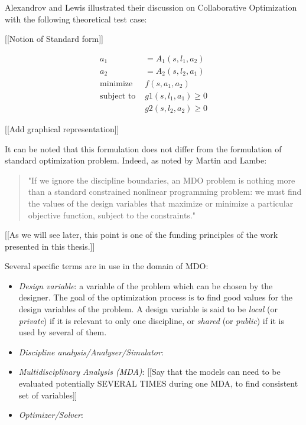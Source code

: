 Alexandrov and Lewis illustrated their discussion on Collaborative Optimization\cite{NataliaM.:2000:ACA:886733} with the following theoretical test case:

[[Notion of Standard form]]

\begin{align*}
a_1 &= A_1(s, l_1, a_2) \\
a_2 &= A_2(s, l_2, a_1) \\
\text{minimize } &f(s, a_1, a_2) \\
\text{subject to } &g1(s, l_1, a_1) \geq 0 \\
								&g2(s, l_2, a_2) \geq 0
\end{align*}

[[Add graphical representation]]

It can be noted that this formulation does not differ from the formulation of standard optimization problem. Indeed, as noted by Martin and Lambe\cite{Lambe:2011:A}:
 \begin{quote}
 "If we ignore the discipline boundaries, an MDO problem is nothing more than a standard constrained nonlinear programming problem: we must find the values of the design variables that maximize or minimize a particular objective function, subject to the constraints."
\end{quote}
[[As we will see later, this point is one of the funding principles of the work presented in this thesis.]]

Several specific terms are in use in the domain of MDO:

\begin{itemize}

\item \emph{Design variable}: a variable of the problem which can be chosen by the designer. The goal of the optimization process is to find good values for the design variables of the problem. A design variable is said to be \emph{local} (or \emph{private}) if it is relevant to only one discipline, or \emph{shared} (or \emph{public}) if it is used by several of them.

\item \emph{Discipline analysis/Analyser/Simulator}: 

\item \emph{Multidisciplinary Analysis (MDA)}: [[Say that the models can need to be evaluated potentially SEVERAL TIMES during one MDA, to find consistent set of variables]]

\item \emph{Optimizer/Solver}: 

\end{itemize}



